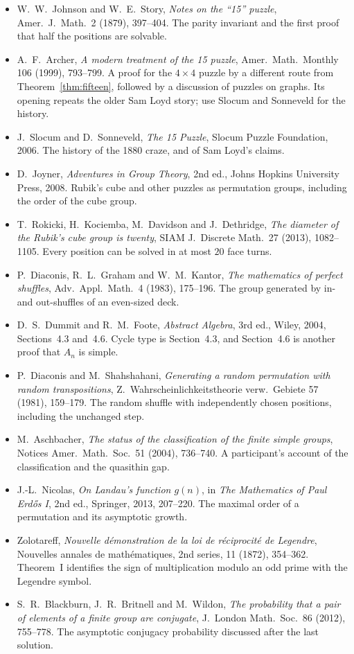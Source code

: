 \begin{itemize}
\item W.~W.~Johnson and W.~E.~Story, \emph{Notes on the ``15'' puzzle}, Amer.\ J.\ Math.\ 2 (1879), 397--404. The parity invariant and the first proof that half the positions are solvable.
\item A.~F.~Archer, \emph{A modern treatment of the 15 puzzle}, Amer.\ Math.\ Monthly 106 (1999), 793--799. A proof for the $4\times4$ puzzle by a different route from Theorem~\ref{thm:fifteen}, followed by a discussion of puzzles on graphs. Its opening repeats the older Sam Loyd story; use Slocum and Sonneveld for the history.
\item J.~Slocum and D.~Sonneveld, \emph{The 15 Puzzle}, Slocum Puzzle Foundation, 2006. The history of the 1880 craze, and of Sam Loyd's claims.
\item D.~Joyner, \emph{Adventures in Group Theory}, 2nd ed., Johns Hopkins University Press, 2008. Rubik's cube and other puzzles as permutation groups, including the order of the cube group.
\item T.~Rokicki, H.~Kociemba, M.~Davidson and J.~Dethridge, \emph{The diameter of the Rubik's cube group is twenty}, SIAM J.\ Discrete Math.\ 27 (2013), 1082--1105. Every position can be solved in at most $20$ face turns.
\item P.~Diaconis, R.~L.~Graham and W.~M.~Kantor, \emph{The mathematics of perfect shuffles}, Adv.\ Appl.\ Math.\ 4 (1983), 175--196. The group generated by in- and out-shuffles of an even-sized deck.
\item D.~S.~Dummit and R.~M.~Foote, \emph{Abstract Algebra}, 3rd ed., Wiley, 2004, Sections~4.3 and~4.6. Cycle type is Section~4.3, and Section~4.6 is another proof that $A_n$ is simple.
\item P.~Diaconis and M.~Shahshahani, \emph{Generating a random permutation with random transpositions}, Z.\ Wahrscheinlichkeitstheorie verw.\ Gebiete 57 (1981), 159--179. The random shuffle with independently chosen positions, including the unchanged step.
\item M.~Aschbacher, \emph{The status of the classification of the finite simple groups}, Notices Amer.\ Math.\ Soc.\ 51 (2004), 736--740. A participant's account of the classification and the quasithin gap.
\item J.-L.~Nicolas, \emph{On Landau's function $g(n)$}, in \emph{The Mathematics of Paul Erd\H{o}s I}, 2nd ed., Springer, 2013, 207--220. The maximal order of a permutation and its asymptotic growth.
\item Zolotareff, \emph{Nouvelle d\'emonstration de la loi de r\'eciprocit\'e de Legendre}, Nouvelles annales de math\'ematiques, 2nd series, 11 (1872), 354--362. Theorem~I identifies the sign of multiplication modulo an odd prime with the Legendre symbol.
\item S.~R.~Blackburn, J.~R.~Britnell and M.~Wildon, \emph{The probability that a pair of elements of a finite group are conjugate}, J.\ London Math.\ Soc.\ 86 (2012), 755--778. The asymptotic conjugacy probability discussed after the last solution.
\end{itemize}
